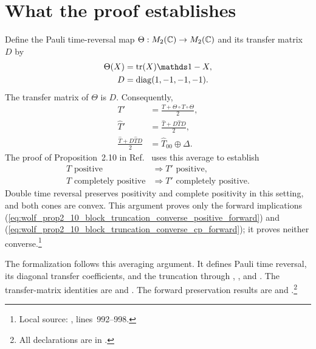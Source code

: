 \documentclass{article}
\begin{document}
\section{What the proof establishes}

Define the Pauli time-reversal map $\Theta:M_{2}(\mathbb{C})\to M_{2}(\mathbb{C})$ and its transfer
matrix $D$ by
\begin{align}
    \Theta(X)
        &=\tr(X)\Id-X,
    \label{eq:wolf_prop2_10_block_truncation_converse_time_reversal}\\
    D
        &=\operatorname{diag}(1,-1,-1,-1).
    \label{eq:wolf_prop2_10_block_truncation_converse_time_reversal_matrix}
\end{align}
The transfer matrix of $\Theta$ is $D$. Consequently,
\begin{align}
    T'
        &=\frac{T+\Theta\circ T\circ\Theta}{2},
    \label{eq:wolf_prop2_10_block_truncation_converse_average_map}\\
    \widehat T'
        &=\frac{\widehat T+D\widehat T D}{2},
    \label{eq:wolf_prop2_10_block_truncation_converse_average_transfer}\\
    \frac{\widehat T+D\widehat T D}{2}
        &=\widehat T_{00}\oplus\Delta.
    \label{eq:wolf_prop2_10_block_truncation_converse_average_truncation}
\end{align}
The proof of Proposition~2.10 in Ref.~\cite{Wolf2012Quantum} uses this
average to establish
\begin{align}
    T\text{ positive}
        &\Longrightarrow T'\text{ positive},
    \label{eq:wolf_prop2_10_block_truncation_converse_positive_forward}\\
    T\text{ completely positive}
        &\Longrightarrow T'\text{ completely positive}.
    \label{eq:wolf_prop2_10_block_truncation_converse_cp_forward}
\end{align}
Double time reversal preserves positivity and complete positivity in this
setting, and both cones are convex. This argument proves only the forward
implications
(\ref{eq:wolf_prop2_10_block_truncation_converse_positive_forward}) and
(\ref{eq:wolf_prop2_10_block_truncation_converse_cp_forward}); it proves
neither converse.\footnote{Local source:
, lines~992--998.}

The formalization follows this averaging argument. It defines Pauli time
reversal, its diagonal transfer coefficients, and the truncation through
,
, and
. The transfer-matrix identities
are  and
. The forward
preservation results are
 and
.\footnote{All declarations
are in
.}
\end{document}

